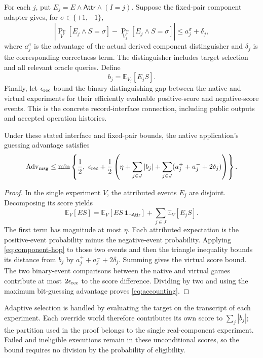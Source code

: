 For each $j$, put $E_j=E\wedge\mathsf{Attr}\wedge(I=j)$.
Suppose the fixed-pair component adapter gives, for $\sigma\in\{+1,-1\}$,
\begin{equation}
\left|\Pr_V[E_j\wedge S=\sigma]
      -\Pr_{V_j}[E_j\wedge S=\sigma]\right|
 \leq a_j^\sigma+\delta_j,                         \label{eq:component-hop}
\end{equation}
where $a_j^\sigma$ is the advantage of the actual derived component
distinguisher and $\delta_j$ is the corresponding correctness term.
The distinguisher includes target selection and all relevant oracle queries.
Define
\[
 b_j=\mathbb E_{V_j}[E_jS].
\]
Finally, let $\epsilon_{\rm rec}$ bound the binary distinguishing gap between
the native and virtual experiments for their efficiently evaluable
positive-score and negative-score events. This is the concrete record-interface
connection, including public outputs and accepted operation histories.

\begin{proposition}
\label{prop:adaptive-accounting}
Under these stated interface and fixed-pair bounds, the native application's
guessing advantage satisfies
\begin{equation}
\operatorname{Adv}_{\rm msg}
 \leq \min\left\{\frac12,\
 \epsilon_{\rm rec}+\frac12
 \left(\eta+\sum_{j\in J}|b_j|
       +\sum_{j\in J}(a_j^{+}+a_j^{-}+2\delta_j)\right)\right\}.
\label{eq:accounting}
\end{equation}
\end{proposition}
\begin{proof}
In the single experiment $V$, the attributed events $E_j$ are disjoint.
Decomposing its score yields
\[
 \mathbb E_V[ES]
 =\mathbb E_V[ES\,\mathbf1_{\neg\mathsf{Attr}}]
   +\sum_{j\in J}\mathbb E_V[E_jS].
\]
The first term has magnitude at most $\eta$. Each attributed expectation is the
positive-event probability minus the negative-event probability. Applying
\eqref{eq:component-hop} to those two events and then the triangle inequality
bounds its distance from $b_j$ by
$a_j^++a_j^-+2\delta_j$. Summing gives the virtual score bound.
The two binary-event comparisons between the native and virtual games contribute at most
$2\epsilon_{\rm rec}$ to the score difference. Dividing by two and using the
maximum bit-guessing advantage proves \eqref{eq:accounting}.
\end{proof}

Adaptive selection is handled by evaluating the target on the transcript
of each experiment. Each override world therefore contributes its own
score to $\sum_j|b_j|$; the partition used in the proof belongs to the
single real-component experiment. Failed and ineligible executions remain
in these unconditional scores, so the bound requires no division by the
probability of eligibility.

